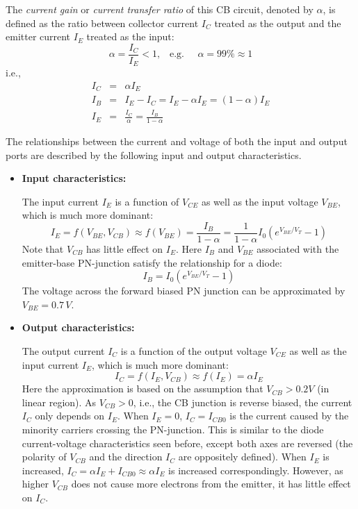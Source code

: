 \begin{itemize}

The {\em current gain} or {\em current transfer ratio} of this CB circuit,
denoted by $\alpha$, is defined as the ratio between collector current 
$I_C$ treated as the output and the emitter current $I_E$ treated as the 
input:
\[ 
\alpha=\frac{I_C}{I_E}<1,\;\;\;\mbox{e.g.}\;\;\;\;\;\alpha =99\% \approx 1
\]
i.e., 
\begin{eqnarray}
  I_C& = &\alpha I_E 
  \nonumber\\
  I_B& =&I_E-I_C=I_E-\alpha I_E=(1-\alpha)I_E
  \nonumber\\
  I_E&=&\frac{I_C}{\alpha}=\frac{I_B}{1-\alpha}
  \nonumber
\end{eqnarray}

The relationships between the current and voltage of both the input 
and output ports are described by the following input and output 
characteristics.

\begin{itemize}
\item {\bf Input characteristics:} 

    The input current $I_E$ is a function of $V_{CE}$ as well as the input
    voltage $V_{BE}$, which is much more dominant:
    \[ 
    I_E=f(V_{BE}, V_{CB})\approx f(V_{BE})=\frac{I_B}{1-\alpha}
    =\frac{1}{1-\alpha} I_0 ( e^{V_{BE}/V_T}-1 )	
    \]
    Note that $V_{CB}$ has little effect on $I_E$.
    Here $I_B$ and $V_{BE}$ associated with the emitter-base PN-junction 
    satisfy the relationship for a diode:
    \[
    I_B=I_0 ( e^{V_{BE}/V_T}-1 )	
    \]
    The voltage across the forward biased PN junction can be approximated
    by $V_{BE}=0.7\,V$. 

  \item {\bf Output characteristics:} 

    The output current $I_C$ is a function of the output voltage $V_{CE}$
    as well as the input current $I_E$, which is much more dominant:
    \[ 
    I_C=f(I_E,V_{CB})\approx f(I_E)=\alpha I_E
    \]
    Here the approximation is based on the assumption that $V_{CB}>0.2V$
    (in linear region). As $V_{CB}>0$, i.e., the CB junction is reverse 
    biased, the current $I_C$ only depends on $I_E$. When $I_E=0$, 
    $I_C=I_{CB0}$ is the current caused by the minority carriers crossing 
    the PN-junction. This is similar to the diode current-voltage 
    characteristics seen before, except both axes are reversed (the 
    polarity of $V_{CB}$ and the direction $I_C$ are oppositely defined).
    When $I_E$ is increased, $I_C=\alpha I_E+I_{CB0}\approx \alpha I_E$ is 
    increased correspondingly. However, as higher $V_{CB}$ does not cause
    more electrons from the emitter, it has little effect on $I_C$.


\end{itemize}
\end{itemize}
